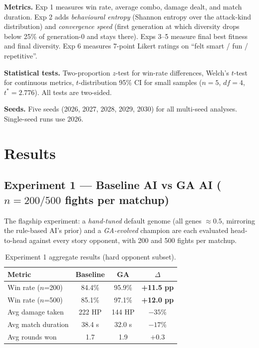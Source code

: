 \documentclass[conference]{IEEEtran}
\begin{document}
\textbf{Metrics.} Exp 1 measures win rate, average combo, damage dealt, and match duration. Exp 2 adds \emph{behavioural entropy} (Shannon entropy over the attack-kind distribution) and \emph{convergence speed} (first generation at which diversity drops below 25\% of generation-0 and stays there). Exps 3--5 measure final best fitness and final diversity. Exp 6 measures 7-point Likert ratings on ``felt smart / fun / repetitive''.

\textbf{Statistical tests.} Two-proportion $z$-test for win-rate differences, Welch's $t$-test for continuous metrics, $t$-distribution 95\% CI for small samples ($n=5$, $df=4$, $t^*=2.776$). All tests are two-sided.

\textbf{Seeds.} Five seeds (2026, 2027, 2028, 2029, 2030) for all multi-seed analyses. Single-seed runs use 2026.

\section{Results}
\label{sec:results}

\subsection{Experiment 1 --- Baseline AI vs GA AI ($n = 200 / 500$ fights per matchup)}

The flagship experiment: a \emph{hand-tuned} default genome (all genes $\approx 0.5$, mirroring the rule-based AI's prior) and a \emph{GA-evolved} champion are each evaluated head-to-head against every story opponent, with 200 and 500 fights per matchup.

\begin{table}[!t]
\centering
\caption{Experiment 1 aggregate results (hard opponent subset).}
\label{tab:exp1}
\begin{tabular}{lccc}
\toprule
\textbf{Metric} & \textbf{Baseline} & \textbf{GA} & \textbf{$\Delta$} \\
\midrule
Win rate ($n$=200)        & 84.4\% & 95.9\% & \textbf{+11.5 pp} \\
Win rate ($n$=500)        & 85.1\% & 97.1\% & \textbf{+12.0 pp} \\
Avg damage taken          & 222 HP & 144 HP & \textbf{$-35\%$} \\
Avg match duration        & 38.4 s & 32.0 s & \textbf{$-17\%$} \\
Avg rounds won            & 1.7    & 1.9    & $+0.3$ \\
\bottomrule
\end{tabular}
\end{table}
\end{document}
